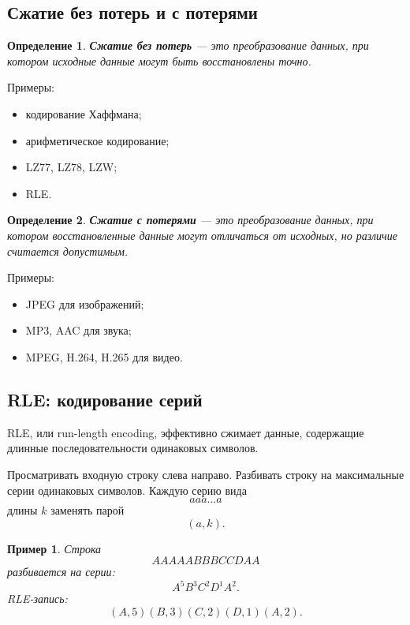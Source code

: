 \documentclass[12pt,a4paper]{article}
\newtheorem{definition}{Определение}[section]
\newtheorem{example}{Пример}[section]
\begin{document}
\subsection{Сжатие без потерь и с потерями}

\begin{definition}
\textbf{Сжатие без потерь} --- это преобразование данных, при котором исходные данные могут быть восстановлены точно.
\end{definition}

Примеры:
\begin{itemize}
    \item кодирование Хаффмана;
    \item арифметическое кодирование;
    \item LZ77, LZ78, LZW;
    \item RLE.
\end{itemize}

\begin{definition}
\textbf{Сжатие с потерями} --- это преобразование данных, при котором восстановленные данные могут отличаться от исходных, но различие считается допустимым.
\end{definition}

Примеры:
\begin{itemize}
    \item JPEG для изображений;
    \item MP3, AAC для звука;
    \item MPEG, H.264, H.265 для видео.
\end{itemize}

\subsection{RLE: кодирование серий}

RLE, или run-length encoding, эффективно сжимает данные, содержащие длинные последовательности одинаковых символов.

\begin{algorithm}[H]
\caption{RLE-кодирование}
\begin{algorithmic}[1]
\STATE Просматривать входную строку слева направо.
\STATE Разбивать строку на максимальные серии одинаковых символов.
\STATE Каждую серию вида
\[
    aaa\dots a
\]
длины $k$ заменять парой
\[
    (a,k).
\]
\end{algorithmic}
\end{algorithm}

\begin{example}
Строка
\[
    AAAAABBBCCDAA
\]
разбивается на серии:
\[
    A^5B^3C^2D^1A^2.
\]
RLE-запись:
\[
    (A,5)(B,3)(C,2)(D,1)(A,2).
\]
\end{example}
\end{document}

